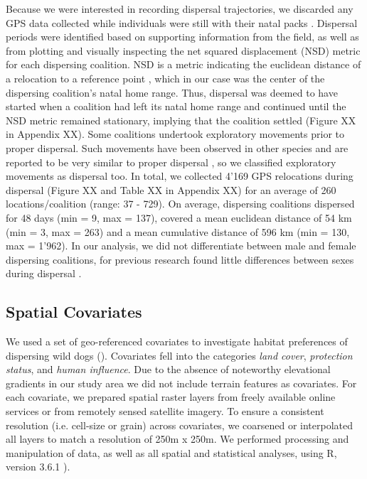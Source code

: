 \documentclass[abstract=on,10pt,a4paper,bibliography=totocnumbered]{article}
\begin{document}
Because we were interested in recording dispersal trajectories, we discarded any
GPS data collected while individuals were still with their natal packs
\citep{Cozzi.2020}. Dispersal periods were identified based on supporting
information from the field, as well as from plotting and visually inspecting the
net squared displacement (NSD) metric for each dispersing coalition. NSD is a
metric indicating the euclidean distance of a relocation to a reference point
\citep{Borger.2012}, which in our case was the center of the dispersing
coalition's natal home range. Thus, dispersal was deemed to have started when a
coalition had left its natal home range and continued until the NSD metric
remained stationary, implying that the coalition settled (Figure XX in Appendix
XX). Some coalitions undertook exploratory movements prior to proper dispersal.
Such movements have been observed in other species and are reported to be very
similar to proper dispersal \citep{Killeen.2014}, so we classified exploratory
movements as dispersal too. In total, we collected 4'169 GPS relocations during
dispersal (Figure XX and Table XX in Appendix XX) for an average of 260
locations/coalition (range: 37 - 729). On average, dispersing coalitions
dispersed for 48 days (min = 9, max = 137), covered a mean euclidean distance of
54 km (min = 3, max = 263) and a mean cumulative distance of 596 km (min = 130,
max = 1'962). In our analysis, we did not differentiate between male and female
dispersing coalitions, for previous research found little differences between
sexes during dispersal \citep{Woodroffe.2019, Cozzi.2020}.

\subsection{Spatial Covariates}
We used a set of geo-referenced covariates to investigate habitat preferences of
dispersing wild dogs (). Covariates fell into the categories
\textit{land cover}, \textit{protection status}, and \textit{human influence}.
Due to the absence of noteworthy elevational gradients in our study area we did
not include terrain features as covariates. For each covariate, we prepared
spatial raster layers from freely available online services or from remotely
sensed satellite imagery. To ensure a consistent resolution (i.e. cell-size or
grain) across covariates, we coarsened or interpolated all layers to match a
resolution of 250m x 250m. We performed processing and manipulation of data, as
well as all spatial and statistical analyses, using R, version 3.6.1
\citep{R.2019}).
\end{document}
